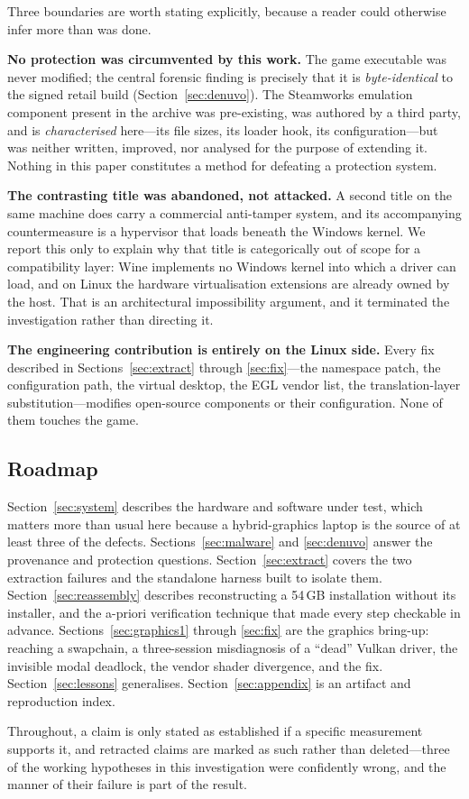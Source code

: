 Three boundaries are worth stating explicitly, because a reader could otherwise
infer more than was done.

\textbf{No protection was circumvented by this work.} The game executable was
never modified; the central forensic finding is precisely that it is
\emph{byte-identical} to the signed retail build (Section~\ref{sec:denuvo}). The
Steamworks emulation component present in the archive was pre-existing, was
authored by a third party, and is \emph{characterised} here---its file sizes,
its loader hook, its configuration---but was neither written, improved, nor
analysed for the purpose of extending it. Nothing in this paper constitutes a
method for defeating a protection system.

\textbf{The contrasting title was abandoned, not attacked.} A second title on the
same machine does carry a commercial anti-tamper system, and its accompanying
countermeasure is a hypervisor that loads beneath the Windows kernel. We report
this only to explain why that title is categorically out of scope for a
compatibility layer: Wine implements no Windows kernel into which a driver can
load, and on Linux the hardware virtualisation extensions are already owned by
the host. That is an architectural impossibility argument, and it terminated the
investigation rather than directing it.

\textbf{The engineering contribution is entirely on the Linux side.} Every fix
described in Sections~\ref{sec:extract} through \ref{sec:fix}---the namespace
patch, the configuration path, the virtual desktop, the EGL vendor list, the
translation-layer substitution---modifies open-source components or their
configuration. None of them touches the game.

\subsection{Roadmap}

Section~\ref{sec:system} describes the hardware and software under test, which
matters more than usual here because a hybrid-graphics laptop is the source of
at least three of the defects. Sections~\ref{sec:malware} and \ref{sec:denuvo}
answer the provenance and protection questions. Section~\ref{sec:extract} covers
the two extraction failures and the standalone harness built to isolate them.
Section~\ref{sec:reassembly} describes reconstructing a 54\,GB installation
without its installer, and the a-priori verification technique that made every
step checkable in advance. Sections~\ref{sec:graphics1} through \ref{sec:fix}
are the graphics bring-up: reaching a swapchain, a three-session misdiagnosis of
a ``dead'' Vulkan driver, the invisible modal deadlock, the vendor shader
divergence, and the fix. Section~\ref{sec:lessons} generalises.
Section~\ref{sec:appendix} is an artifact and reproduction index.

Throughout, a claim is only stated as established if a specific measurement
supports it, and retracted claims are marked as such rather than deleted---three
of the working hypotheses in this investigation were confidently wrong, and the
manner of their failure is part of the result.
